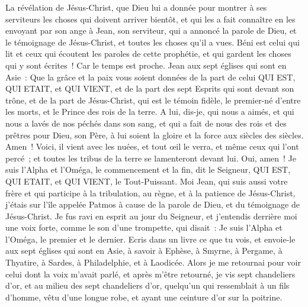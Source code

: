 \begin{multicols}{2}
\VerseOne{}La révélation de Jésus-Christ, que Dieu lui a donnée pour montrer à ses serviteurs les choses qui doivent arriver bientôt, et qui les a fait connaître en les envoyant par son ange à Jean, son serviteur,
qui a annoncé la parole de Dieu, et le témoignage de Jésus-Christ, et toutes les choses qu'il a vues.
Béni est celui qui lit et ceux qui écoutent les paroles de cette prophétie, et qui gardent les choses qui y sont écrites~! Car le temps est proche.
Jean aux sept églises qui sont en Asie~: Que la grâce et la paix vous soient données de la part de celui QUI EST, QUI ETAIT, et QUI VIENT, et de la part des sept Esprits qui sont devant son trône,
et de la part de Jésus-Christ, qui est le témoin fidèle, le premier-né d'entre les morts, et le Prince des rois de la terre.
A lui, dis-je, qui nous a aimés, et qui nous a lavés de nos péchés dans son sang, et qui a fait de nous des rois et des prêtres pour Dieu, son Père, à lui soient la gloire et la force aux siècles des siècles. Amen~!
Voici, il vient avec les nuées, et tout œil le verra, et même ceux qui l'ont percé~; et toutes les tribus de la terre se lamenteront devant lui. Oui, amen~!
Je suis l'Alpha et l'Oméga, le commencement et la fin, dit le Seigneur, QUI EST, QUI ETAIT, et QUI VIENT, le Tout-Puissant.
Moi Jean, qui suis aussi votre frère et qui participe à la tribulation, au règne, et à la patience de Jésus-Christ, j'étais sur l'île appelée Patmos à cause de la parole de Dieu, et du témoignage de Jésus-Christ.
Je fus ravi en esprit au jour du Seigneur, et j'entendis derrière moi une voix forte, comme le son d'une trompette,
qui disait~: Je suis l'Alpha et l'Oméga, le premier et le dernier. Ecris dans un livre ce que tu vois, et envoie-le aux sept églises qui sont en Asie, à savoir à Ephèse, à Smyrne, à Pergame, à Thyatire, à Sardes, à Philadelphie, et à Laodicée.
Alors je me retournai pour voir celui dont la voix m'avait parlé, et après m'être retourné, je vis sept chandeliers d'or,
et au milieu des sept chandeliers d'or, quelqu'un qui ressemblait à un fils d'homme, vêtu d'une longue robe, et ayant une ceinture d'or sur la poitrine.

\end{multicols}
